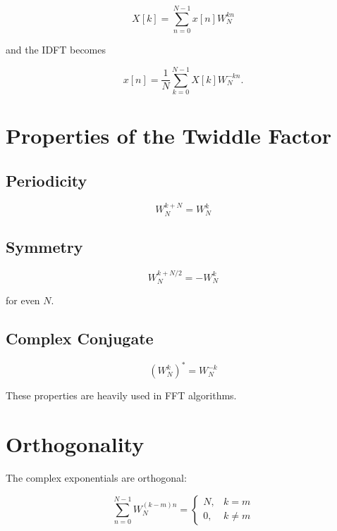 \[
\boxed{
X[k]=
\sum_{n=0}^{N-1}
x[n]W_N^{kn}
}
\]

and the IDFT becomes

\[
\boxed{
x[n]=
\frac{1}{N}
\sum_{k=0}^{N-1}
X[k]W_N^{-kn}.
}
\]


\section{Properties of the Twiddle Factor}


\subsection{Periodicity}

\[
\boxed{
W_N^{k+N}=W_N^k
}
\]


\subsection{Symmetry}

\[
\boxed{
W_N^{k+N/2}=-W_N^k
}
\]

for even \(N\).


\subsection{Complex Conjugate}

\[
\boxed{
(W_N^k)^*=W_N^{-k}
}
\]

These properties are heavily used in FFT algorithms.


\section{Orthogonality}

The complex exponentials are orthogonal:

\[
\boxed{
\sum_{n=0}^{N-1}W_N^{(k-m)n}=
\begin{cases}
N, & k=m\\
0, & k\neq m
\end{cases}
}
\]

